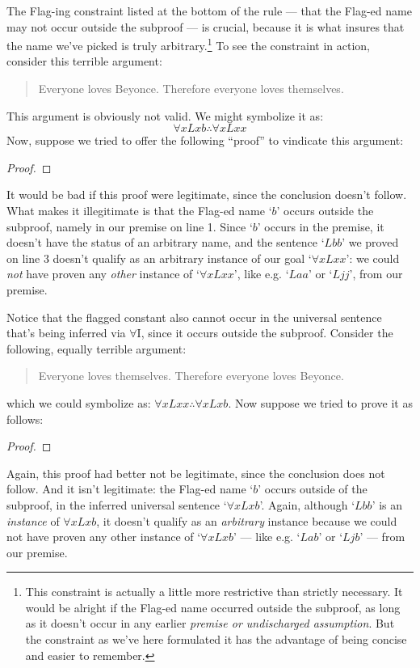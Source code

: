 The Flag-ing constraint listed at the bottom of the rule --- that the Flag-ed name may not occur outside the subproof --- is crucial, because it is what insures that the name we've picked is truly arbitrary.\footnote{This constraint is actually a little more restrictive than strictly necessary.  It would be alright if the Flag-ed name occurred outside the subproof, as long as it doesn't occur in any earlier \emph{premise or undischarged assumption}. But the constraint as we've here formulated it has the advantage of being concise and easier to remember.}  To see the constraint in action, consider this terrible argument:
	\begin{quote}
		Everyone loves Beyonce.  Therefore everyone loves themselves.
	\end{quote}
This argument is obviously not valid.  We might symbolize it as:
$$\forall x Lxb \therefore \forall x Lxx$$
Now, suppose we tried to offer the following ``proof'' to vindicate this argument:
\begin{proof}
	 
	\open
	 \fl{}
	 
	\close
	 
\end{proof}\noindent
It would be bad if this proof were legitimate, since the conclusion doesn't follow.  What makes it illegitimate is that the Flag-ed name `$b$' occurs outside the subproof, namely in our premise on line 1. Since `$b$' occurs in the premise, it doesn't have the status of an arbitrary name, and the sentence `$Lbb$' we proved on line 3 doesn't qualify as an arbitrary instance of our goal `$\forall xLxx$': we could \emph{not} have proven any \emph{other} instance of `$\forall xLxx$', like e.g. `$Laa$' or `$Ljj$', from our premise.

Notice that the flagged constant also cannot occur in the universal sentence that's being inferred via $\forall$I, since it occurs outside the subproof.  Consider the following, equally terrible argument:

	\begin{quote}
		Everyone loves themselves.  Therefore everyone loves Beyonce.
\end{quote}
which we could symbolize as: $\forall xLxx \therefore \forall xLxb$.  Now suppose we tried to prove it as follows:
\begin{proof}
	 
	\open
	 \fl{}
	 
	\close
	 
\end{proof}\noindent
Again, this proof had better not be legitimate, since the conclusion does not follow.  And it isn't legitimate: the Flag-ed name `$b$' occurs outside of the subproof, in the inferred universal sentence `$\forall x Lxb$'.  Again, although `$Lbb$' is an \emph{instance} of $\forall xLxb$, it doesn't qualify as an \emph{arbitrary} instance because we could not have proven any other instance of `$\forall xLxb$' --- like e.g. `$Lab$' or `$Ljb$' --- from our premise.

